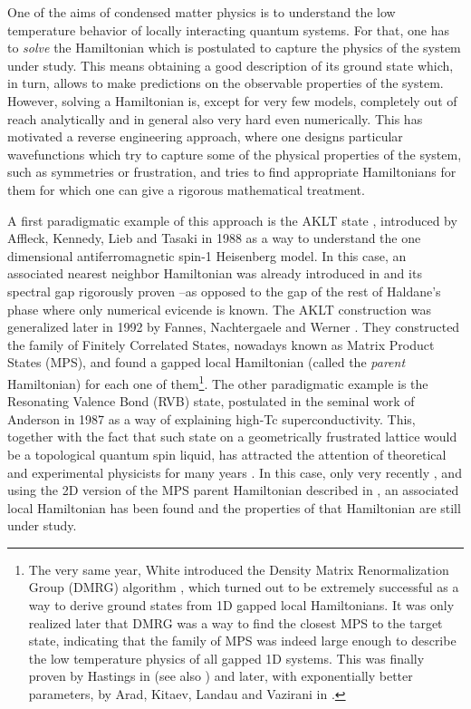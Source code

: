 \documentclass[cmp]{svjour}
\begin{document}
One of the aims of condensed matter physics is to understand the low temperature behavior of locally interacting quantum systems. For that, one has to {\it solve} the Hamiltonian which is postulated to capture the physics of the system under study. This means obtaining a good description of its ground state which, in turn, allows to make predictions on the observable properties of the system. However, solving a Hamiltonian is, except for very few models, completely out of reach analytically and in general also very hard even numerically. This has motivated a reverse engineering approach, where one designs particular wavefunctions which try to capture some of the physical properties of the system, such as symmetries or frustration, and tries to find appropriate Hamiltonians for them for which one can give a rigorous mathematical treatment.

A first paradigmatic example of this approach is the AKLT state \cite{aklt}, introduced by Affleck, Kennedy, Lieb and Tasaki in 1988 as a way to understand the one dimensional antiferromagnetic spin-1 Heisenberg model. In this case, an associated nearest neighbor Hamiltonian was already introduced in \cite{aklt} and its spectral gap rigorously proven --as opposed to the gap of the rest of Haldane's phase where only numerical evicende is known. The AKLT construction was generalized later in 1992 by Fannes, Nachtergaele and Werner \cite{fannes:FCS}. They constructed the family of Finitely Correlated States, nowadays known as Matrix Product States (MPS), and found a gapped local Hamiltonian (called the {\it parent} Hamiltonian) for each one of them\footnote{The very same year, White introduced the Density Matrix Renormalization Group (DMRG) algorithm \cite{White}, which turned out to be extremely successful as a way to derive ground states from 1D gapped local Hamiltonians. It was only realized later that DMRG was a way to find the closest MPS to the target state, indicating that the family of MPS was indeed large enough to describe the low temperature physics of all gapped 1D systems. This was finally proven by Hastings in \cite{Hastings} (see also \cite{Verstraete-faithfully}) and later, with exponentially better parameters, by Arad, Kitaev, Landau and Vazirani in \cite{arad}.}. The other paradigmatic example is the Resonating Valence Bond (RVB) state, postulated in the seminal work of Anderson \cite{RVBS-Anderson} in 1987 as a way of explaining high-Tc superconductivity. This, together with the fact that such state on a geometrically frustrated lattice would be a topological quantum spin liquid, has attracted the attention of theoretical and experimental physicists for many years \cite{balents}. In this case, only very recently \cite{RVBS-PEPS,Seidel:RVBS}, and using the 2D version of the MPS parent Hamiltonian described in
\cite{perez-garcia:pepsasgroundstates,schuch:peps-sym}, an associated local Hamiltonian has been found and the properties of that Hamiltonian are still under study.
\end{document}
